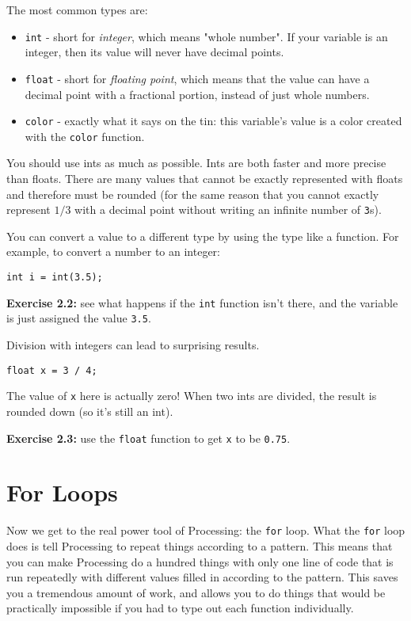 \documentclass[
]{leaflet}
\begin{document}
The most common types are:
\begin{itemize}
  \item \texttt{int} - short for \textit{integer}, which means "whole number".
    If your variable is an integer, then its value will never have decimal points.

  \item \texttt{float} - short for \textit{floating point}, which means that the value can have a decimal point with a fractional portion, instead of just whole numbers.

  \item \texttt{color} - exactly what it says on the tin: this variable's value is a color created with the \texttt{color} function.
\end{itemize}

You should use ints as much as possible.
Ints are both faster and more precise than floats.
There are many values that cannot be exactly represented with floats and therefore must be rounded (for the same reason that you cannot exactly represent $1/3$ with a decimal point without writing an infinite number of \texttt{3}s).

You can convert a value to a different type by using the type like a function.
For example, to convert a number to an integer:
\begin{lstlisting}
int i = int(3.5);
\end{lstlisting}

\textbf{Exercise 2.2:} see what happens if the \texttt{int} function isn't there, and the variable is just assigned the value \texttt{3.5}.

Division with integers can lead to surprising results.
\begin{lstlisting}
float x = 3 / 4;
\end{lstlisting}
\vspace{-0.5em}
The value of \texttt{x} here is actually zero!
When two ints are divided, the result is rounded down (so it's still an int).

\textbf{Exercise 2.3:} use the \texttt{float} function to get \texttt{x} to be \texttt{0.75}.

\section{For Loops}

Now we get to the real power tool of Processing: the \texttt{for} loop.
What the \texttt{for} loop does is tell Processing to repeat things according to a pattern.
This means that you can make Processing do a hundred things with only one line of code that is run repeatedly with different values filled in according to the pattern.
This saves you a tremendous amount of work, and allows you to do things that would be practically impossible if you had to type out each function individually.
\end{document}
